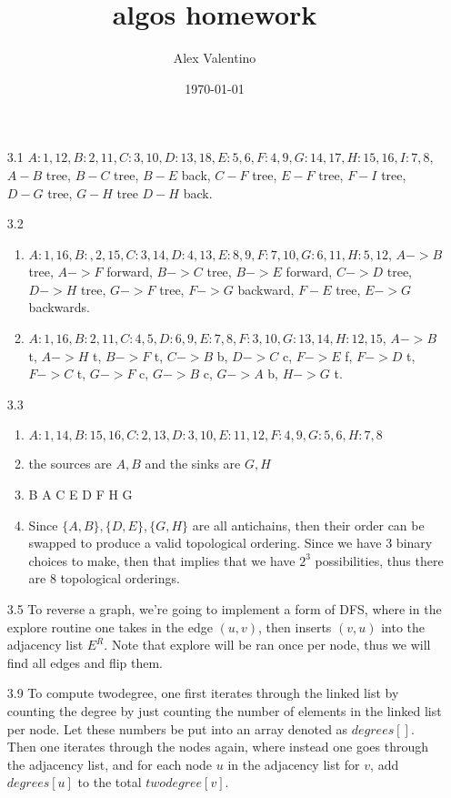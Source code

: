 \documentclass[12pt, letterpaper]{article}
\date{\today}
\author{Alex Valentino}
\title{algos homework}
\begin{document}
\begin{enumerate}
	\item[3.1] $A: 1,12, B:2,11, C:3,10, D:13,18,E:5,6, F:4,9 ,G:14,17, H: 15,16, I:7,8$, $A-B$ tree, $B-C$ tree, $B-E$ back, 
	$C-F$ tree, $E-F$ tree, $F-I$ tree, $D-G$ tree, $G-H$ tree
	$D-H$ back.
	\item[3.2]
	\begin{enumerate}
		\item $A: 1,16, B:,2,15,C:3,14,D:4,13,E:8,9,F:7,10, G:6,11,
		H:5,12$, $A->B$ tree, $A->F$ forward, $B-> C$ tree, 
		$B->E$ forward, $C->D$ tree, $D-> H$ tree, $G -> F$ 
		tree, $F -> G$ backward, $F-E$ tree, $E -> G$ backwards.
		\item $A:1,16, B:2,11, C:4,5, D:6,9, E:7,8, F:3,10, 
		G:13,14, H:12,15$, $A->B$ t, $A->H$ t, $B->F$ t, 
		$C->B$ b, $D->C$ c, $F->E$ f, $F->D$ t, $F->C$ t, 
		$G->F$ c, $G-> B$ c, $G-> A$ b, $H-> G$ t. 
	\end{enumerate}
	\item[3.3]
	\begin{enumerate}
		\item $A:1,14,B:15,16,C:2,13,D:3,10,E:11,12, F:4,9, 
		G:5,6,H:7,8$
		\item the sources are $A,B$ and the sinks are 
		$G,H$
		\item B A C E D F H G
		\item Since $\{A,B\},\{D,E\},\{G,H\}$ are all 
		antichains, then their order can be swapped to produce 
		a valid topological ordering.  Since we have 3 binary 
		choices to make, then that implies that we have $2^3$
		possibilities, thus there are 8 topological orderings. 
	\end{enumerate}
	\item[3.5] To reverse a graph, we're going to implement 
	a form of DFS, where in the explore routine one takes 
	in the edge $(u,v)$, then inserts $(v,u)$ into the 
	adjacency list $E^R$.  Note that explore will be ran once 
	per node, thus we will find all edges and flip them.  
	\item[3.9] To compute twodegree, one first iterates through the 
	linked list by counting the degree by just counting the number 
	of elements in the linked list per node.  Let these numbers be put into an 
	array denoted as $degrees[]$.   Then one iterates through 
	the nodes again, where instead one goes through the adjacency 
	list, and for each node $u$ in the adjacency list for $v$, add $degrees[u]$ to the total $twodegree[v]$.  
	
\end{enumerate}
\end{document}
